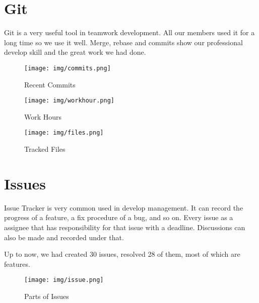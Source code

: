 \section{Git}
\label{sec:git}
  Git is a very useful tool in teamwork development. All our members used it for a long time so we use it well.
  Merge, rebase and commits show our professional develop skill and the great work we had done.
  \begin{figure}[H]
    \centering
    \texttt{[image: img/commits.png]}
    \caption{Recent Commits\label{fig:commits}}
  \end{figure}
  \begin{figure}[H]
    \centering
    \texttt{[image: img/workhour.png]}
    \caption{Work Hours\label{fig:workhour}}
  \end{figure}
  \begin{figure}[H]
    \centering
    \texttt{[image: img/files.png]}
    \caption{Tracked Files\label{fig:files}}
  \end{figure}
\section{Issues}
\label{sec:issue}
  Issue Tracker is very common used in develop management. It can record the progress of a feature, a fix procedure of a bug, and so on.
  Every issue as a assignee that has responsibility for that issue with a deadline. Discussions can also be made and recorded under that.

  Up to now, we had created 30 issues, resolved 28 of them, most of which are features.
  \begin{figure}[H]
    \centering
    \texttt{[image: img/issue.png]}
    \caption{Parts of Issues\label{fig:issue}}
  \end{figure}
